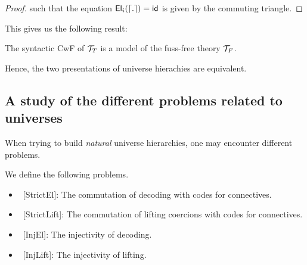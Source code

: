 \documentclass{article}
\begin{document}
\begin{proof}
    such that the equation $\textsf{El}_i(\left\lceil . \right\rceil) = \textsf{id}$ is given by the commuting triangle. 

\end{proof}

This gives us the following result:

\begin{theoreme}
    The syntactic CwF of $\mathcal{T}_T$ is a model of the fuss-free theory $\mathcal{T}_F$.
\end{theoreme}

Hence, the two presentations of universe hierachies are equivalent.\\

\subsection{A study of the different problems related to universes}

When trying to build \textit{natural} universe hierarchies, one may encounter different
problems.

\begin{definition}
    We define the following problems.

    \begin{itemize}
        \item\ [StrictEl]: The commutation of decoding with codes for connectives.
        \item\ [StrictLift]: The commutation of lifting coercions with codes for connectives.
        \item\ [InjEl]: The injectivity of decoding. 
        \item\ [InjLift]: The injectivity of lifting.
    \end{itemize}
\end{definition}
\end{document}
